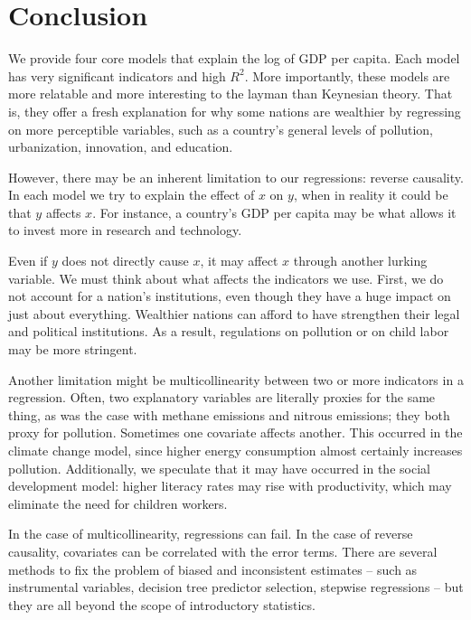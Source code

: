 \documentclass[11pt]{article}
\begin{document}
\section{Conclusion}
\label{sec:conclusion}
We provide four core models that explain the log of GDP per capita.
Each model has very significant indicators and high $R^2$.
More importantly, these models are more relatable and more interesting to the layman than Keynesian theory.
That is, they offer a fresh explanation for why some nations are wealthier by regressing on more perceptible variables, such as a country's general levels of pollution, urbanization, innovation, and education.

However, there may be an inherent limitation to our regressions: reverse causality.
In each model we try to explain the effect of $x$ on $y$, when in reality it could be that $y$ affects $x$. For instance, a country's GDP per capita may be what allows it to invest more in research and technology.

Even if $y$ does not directly cause $x$, it may affect $x$ through another lurking variable. We must think about what affects the indicators we use. First, we do not account for a nation's institutions, even though they have a huge impact on just about everything. Wealthier nations can afford to have strengthen their legal and political institutions. As a result, regulations on pollution or on child labor may be more stringent.

Another limitation might be multicollinearity between two or more indicators in a regression. Often, two explanatory variables are literally proxies for the same thing, as was the case with methane emissions and nitrous emissions; they both proxy for pollution. Sometimes one covariate affects another. This occurred in the climate change model, since higher energy consumption almost certainly increases pollution. Additionally, we speculate that it may have occurred in the social development model: higher literacy rates may rise with productivity, which may eliminate the need for children workers.

In the case of multicollinearity, regressions can fail. In the case of reverse causality, covariates can be correlated with the error terms. There are several methods to fix the problem of biased and inconsistent estimates -- such as instrumental variables, decision tree predictor selection, stepwise regressions -- but they are all beyond the scope of introductory statistics.
\end{document}
